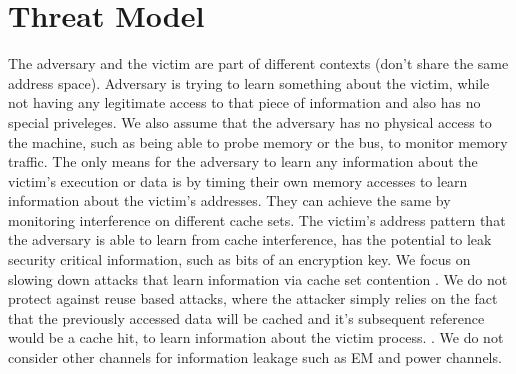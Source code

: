 \section{Threat Model}
The adversary and the victim are part of different contexts (don't share the same address space). Adversary is trying to learn something about the victim, while not having any legitimate access to that piece of information and also has no special priveleges. We also assume that the adversary has no physical access to the machine, such as being able to probe memory or the bus, to monitor memory traffic. The only means for the adversary to learn any information about the victim's execution or data is by timing their own memory accesses to learn information about the victim's addresses. They can achieve the same by monitoring interference on different cache sets. The victim's address pattern that the adversary is able to learn from cache interference, has the potential to leak security critical information, such as bits of an encryption key. We focus on slowing down attacks that learn information via cache set contention \cite{p+p}. We do not protect against reuse based attacks, where the attacker simply relies on the fact that the previously accessed data will be cached and it's subsequent reference would be a cache hit, to learn information about the victim process. \cite{rfill,F+F}.  We do not consider other channels for information leakage such as EM \cite{} and power channels\cite{}.       
